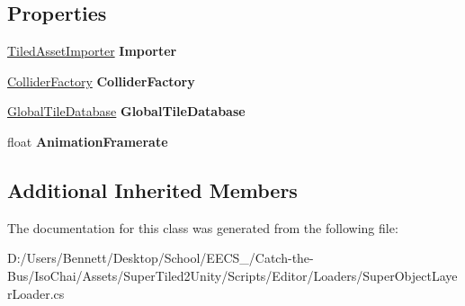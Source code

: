 \subsection*{Properties}
\begin{DoxyCompactItemize}
\item 
\mbox{\label{class_super_tiled2_unity_1_1_editor_1_1_super_object_layer_loader_a0b80b67bcc6a73ba42ae72b3c65c5fc8}} 
\mbox{\hyperlink{class_super_tiled2_unity_1_1_editor_1_1_tiled_asset_importer}{Tiled\+Asset\+Importer}} {\bfseries Importer}
\item 
\mbox{\label{class_super_tiled2_unity_1_1_editor_1_1_super_object_layer_loader_a66d595fb45a06e6f598d30a0cbc4d498}} 
\mbox{\hyperlink{class_super_tiled2_unity_1_1_editor_1_1_collider_factory}{Collider\+Factory}} {\bfseries Collider\+Factory}
\item 
\mbox{\label{class_super_tiled2_unity_1_1_editor_1_1_super_object_layer_loader_aa857730d64559d005b634b05a3b23bc1}} 
\mbox{\hyperlink{class_super_tiled2_unity_1_1_editor_1_1_global_tile_database}{Global\+Tile\+Database}} {\bfseries Global\+Tile\+Database}
\item 
\mbox{\label{class_super_tiled2_unity_1_1_editor_1_1_super_object_layer_loader_ae86cc257dbf87e1a1a5dde628b075447}} 
float {\bfseries Animation\+Framerate}
\end{DoxyCompactItemize}
\subsection*{Additional Inherited Members}


The documentation for this class was generated from the following file\+:\begin{DoxyCompactItemize}
\item 
D\+:/\+Users/\+Bennett/\+Desktop/\+School/\+E\+E\+C\+S\+\_/\+Catch-\/the-\/\+Bus/\+Iso\+Chai/\+Assets/\+Super\+Tiled2\+Unity/\+Scripts/\+Editor/\+Loaders/Super\+Object\+Layer\+Loader.\+cs\end{DoxyCompactItemize}

